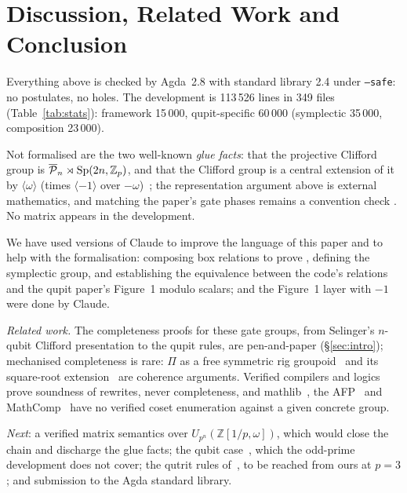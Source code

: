 \section{Discussion, Related Work and Conclusion}\label{sec:discussion}

Everything above is checked by Agda~2.8 with standard library 2.4
under \texttt{--safe}: no postulates, no holes.  The development is
113\,526 lines in 349 files (Table~\ref{tab:stats}): framework
15\,000, qupit-specific 60\,000 (symplectic 35\,000, composition
23\,000).

Not formalised are the two well-known \emph{glue facts}: that the
projective Clifford group is $\overline{\mathcal{P}}_{n} \rtimes \mathrm{Sp}(2n,\mathbb{Z}_p)$, and that the
Clifford group is a central extension of it by
$\langle\omega\rangle$ (times $\langle -1\rangle$ over
$-\omega$)~\cite{gross2006hudson,gurevich2007geometric}; the
representation argument above is external mathematics, and matching
the paper's gate phases remains a convention check
\cite{bian2026qudit,neuhauser2002metaplectic}.  No matrix appears in
the development.

We have used versions of Claude to improve the language of
this paper and to help with the formalisation: composing box relations
to prove , defining the symplectic group, and
establishing the equivalence between the code's relations and the
qupit paper's Figure~1 modulo scalars;  and
the Figure~1 layer with $-1$ were done by Claude.

\emph{Related work.}  The completeness proofs for these gate groups,
from Selinger's $n$-qubit Clifford presentation to the qupit rules,
are pen-and-paper (\S\ref{sec:intro}); mechanised completeness is
rare: $\Pi$ as a free symmetric rig
groupoid~\cite{choudhury2022symmetries} and its square-root
extension~\cite{carette2024squareroots} are coherence arguments.
Verified compilers and
logics~\cite{paykin2017qwire,hietala2021voqc,lehmann2025vyzx,zhou2023coqq,chareton2021qbricks,li2022vqo,peduri2025qbc}
prove soundness of rewrites, never completeness, and
mathlib~\cite{mathlib2020,mathlib-doc-presented}, the
AFP~\cite{breitner2010freegroups,kharim2023freegroups} and
MathComp~\cite{gonthier2013oddorder} have no verified coset enumeration
against a given concrete group.

\emph{Next}: a verified matrix semantics over
$U_{p^n}(\mathbb{Z}[1/p,\omega])$, which would close the chain and
discharge the glue facts; the qubit
case~\cite{selinger2015clifford}, which the odd-prime development
does not cover; the qutrit rules of~\cite{li2025qutrit}, to be
reached from ours at $p = 3$; and submission to the Agda standard
library.
